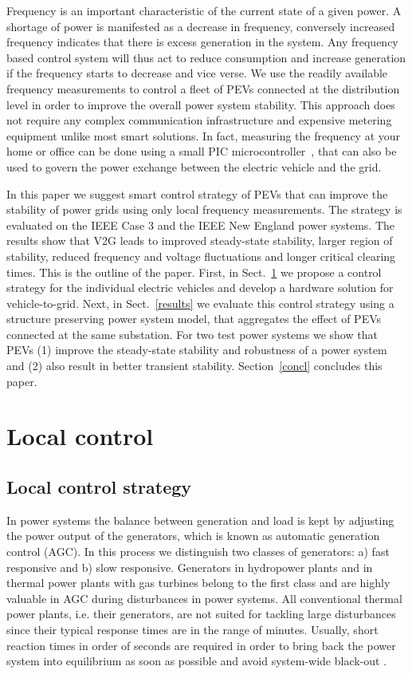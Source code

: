 \documentclass[final,12pt]{elsarticle}
\begin{document}
Frequency is an important characteristic of the current state of a given power.
A shortage of power is manifested as a decrease in frequency, conversely increased frequency indicates that there is excess generation in the system.
Any frequency based control system will thus act to reduce consumption and increase generation if the frequency starts to decrease and vice verse.
We use the readily available frequency measurements to control a fleet of PEVs connected at the distribution level in order to improve the overall power system stability. This approach does not require any complex communication infrastructure and expensive metering equipment unlike most smart solutions. In fact, measuring the frequency at your home or office can be done using a small PIC microcontroller~\cite{alam2013measurement}, that can also be used to govern the power exchange between the electric vehicle and the grid.


In this paper we suggest smart control strategy of PEVs that can improve the stability of power grids using only local frequency measurements. The strategy is evaluated on the IEEE Case 3 and the IEEE New England power systems. The results show that V2G leads to improved steady-state stability, larger region of stability, reduced frequency and voltage fluctuations and longer critical clearing times. This is the outline of the paper. 
First, in Sect.~\ref{sec:local_control} we propose a control strategy for the individual electric vehicles and develop a hardware solution for vehicle-to-grid. Next, in Sect.~\ref{results} we evaluate this control strategy using a structure preserving power system model, that aggregates the effect of PEVs connected at the same substation. For two test power systems we show that PEVs (1) improve the steady-state stability and robustness of a power system and (2) also result in better transient stability. Section~\ref{concl} concludes this paper.


\section{Local control}
\label{sec:local_control}

\subsection{Local control strategy} 

In power systems the balance between generation and load is kept by adjusting
the power output of the generators, which is known as automatic generation
control (AGC). In this process we distinguish two classes of generators: a) fast
responsive and b) slow responsive. Generators in hydropower plants and in
thermal power plants with gas turbines belong to the first class and are
highly valuable in AGC during disturbances in power systems. All conventional
thermal power plants, i.e. their generators, are not suited for tackling
large disturbances since their typical response times are in the range of
minutes. Usually, short reaction times in order of seconds are required in order
to bring back the power system into equilibrium as soon as possible and avoid
system-wide black-out \cite{machowski2011power}.
\end{document}
